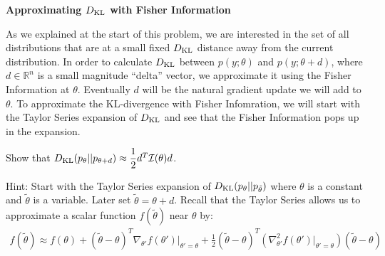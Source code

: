 \ifnum{} {
  \clearpage
} \fi
\item {} \textbf{Approximating $D_{\text{KL}}$ with Fisher Information}

As we explained at the start of this problem, we are interested in the set of all distributions that are at a small fixed $D_{\text{KL}}$ distance away from the current distribution. In order to calculate $D_{\text{KL}}$ between $p(y;\theta)$ and $p(y;\theta+d)$, where $d \in \mathbb{R}^n$ is a small magnitude ``delta'' vector, we approximate it using the Fisher Information at $\theta$. Eventually $d$ will be the natural gradient update we will add to $\theta$. To approximate the KL-divergence with Fisher Infomration, we will start with the Taylor Series expansion of $D_{\text{KL}}$ and see that the Fisher Information pops up in the expansion.

Show that $D_{\text{KL}}(p_{\theta}||p_{\theta+d})\approx \dfrac{1}{2}d^T\mathcal{I}(\theta)d$.

Hint: Start with the Taylor Series expansion of $D_{\text{KL}}(p_{\theta}||p_{\tilde{\theta}})$ where $\theta$ is a constant and $\tilde{\theta}$ is a variable. Later set $\tilde{\theta}= \theta + d$. Recall that the Taylor Series allows us to approximate a scalar function $f(\tilde{\theta})$ near $\theta$ by:
\begin{align*}
    f(\tilde{\theta})\approx f(\theta)+(\tilde{\theta}-\theta)^T\nabla_{\theta'} f(\theta')|_{\theta'=\theta} + \frac{1}{2}(\tilde{\theta}-\theta)^T \left(\nabla^2_{\theta'}f(\theta')|_{\theta'=\theta}\right) (\tilde{\theta}-\theta)
\end{align*}

\ifnum{} {
  
} \fi
